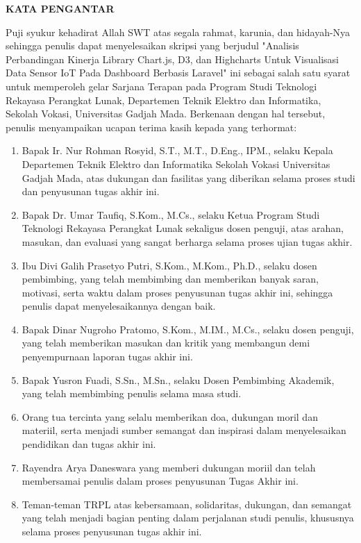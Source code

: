 \clearpage
{}
{}
\begin{center}
    \textbf{\large KATA PENGANTAR}\\[3em]
\end{center}

Puji syukur kehadirat Allah SWT atas segala rahmat, karunia, dan hidayah-Nya sehingga penulis dapat menyelesaikan skripsi yang berjudul "Analisis Perbandingan Kinerja Library Chart.js, D3, dan Highcharts Untuk Visualisasi Data Sensor IoT Pada Dashboard Berbasis Laravel" ini sebagai salah satu syarat untuk memperoleh gelar Sarjana Terapan pada Program Studi Teknologi Rekayasa Perangkat Lunak, Departemen Teknik Elektro dan Informatika, Sekolah Vokasi, Universitas Gadjah Mada. Berkenaan dengan hal tersebut, penulis menyampaikan ucapan terima kasih kepada yang terhormat:

\begin{enumerate}
	\item Bapak Ir. Nur Rohman Rosyid, S.T., M.T., D.Eng., IPM., selaku Kepala Departemen Teknik Elektro dan Informatika Sekolah Vokasi Universitas Gadjah Mada, atas dukungan dan fasilitas yang diberikan selama proses studi dan penyusunan tugas akhir ini.
	
	\item Bapak Dr. Umar Taufiq, S.Kom., M.Cs., selaku Ketua Program Studi Teknologi Rekayasa Perangkat Lunak sekaligus dosen penguji, atas arahan, masukan, dan evaluasi yang sangat berharga selama proses ujian tugas akhir.
	
	\item Ibu Divi Galih Prasetyo Putri, S.Kom., M.Kom., Ph.D., selaku dosen pembimbing, yang telah membimbing dan memberikan banyak saran, motivasi, serta waktu dalam proses penyusunan tugas akhir ini, sehingga penulis dapat menyelesaikannya dengan baik.
	
	\item Bapak Dinar Nugroho Pratomo, S.Kom., M.IM., M.Cs., selaku dosen penguji, yang telah memberikan masukan dan kritik yang membangun demi penyempurnaan laporan tugas akhir ini.
	
	\item Bapak Yusron Fuadi, S.Sn., M.Sn., selaku Dosen Pembimbing Akademik, yang telah membimbing penulis selama masa studi. 
	
	\item Orang tua tercinta yang selalu memberikan doa, dukungan moril dan materiil, serta menjadi sumber semangat dan inspirasi dalam menyelesaikan pendidikan dan tugas akhir ini.
	
	\item Rayendra Arya Daneswara yang memberi dukungan moriil dan telah membersamai penulis dalam proses penyusunan Tugas Akhir ini.
	
	\item Teman-teman TRPL atas kebersamaan, solidaritas, dukungan, dan semangat yang telah menjadi bagian penting dalam perjalanan studi penulis, khususnya selama proses penyusunan tugas akhir ini.
	
\end{enumerate}

